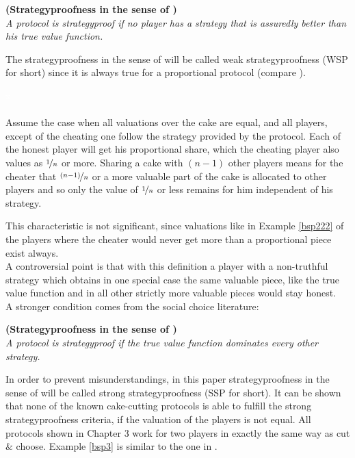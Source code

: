 \begin{defi}{\textbf{(Strategyproofness in the sense of \cite{pie})}}\\
\emph{A protocol is \emph{strategyproof} if no player has a strategy that is assuredly better than his true value function.}
\end{defi}
The strategyproofness in the sense of \cite{pie} will be called weak strategyproofness (WSP for short) since it is always true for a proportional protocol (compare \cite{ccc}).
\begin{bsp}
\label{bsp222}
\textcolor{white}{x}\\\\
Assume the case when all valuations over the cake are equal, and all players, except of the cheating one follow the strategy provided by the protocol. Each of the honest player will get his proportional share, which the cheating player also values as $\nicefrac{1}{n}$ or more. Sharing a cake with $(n-1)$ other players means for the cheater that $\nicefrac{(n-1)}{n}$ or a more valuable part of the cake is allocated to other players and so only the value of $\nicefrac{1}{n}$ or less remains for him independent of his strategy. 
\end{bsp}
This characteristic is not significant, since valuations like in Example \ref{bsp222} of the players where the cheater would never get more than a proportional piece exist always.\\
A controversial point is that with this definition a player with a non-truthful strategy which obtains in one special case the same valuable piece, like the true value function and in all other strictly more valuable pieces would stay honest.\\
\newline
A stronger condition comes from the social choice literature:

\begin{defi}{\textbf{(Strategyproofness in the sense of \cite{why})}}\\
\emph{A protocol is \emph{strategyproof} if the true value function dominates every other strategy.}
\end{defi}

In order to prevent misunderstandings, in this paper strategyproofness in the sense of \cite{why} will be called strong strategyproofness (SSP for short). It can be shown that none of the known cake-cutting protocols is able to fulfill the strong strategyproofness criteria, if the valuation of the players is not equal. All protocols shown in Chapter 3 work for two players in exactly the same way as cut $\&$ choose. Example \ref{bsp3} is similar to the one in \cite{chen:truth}.


